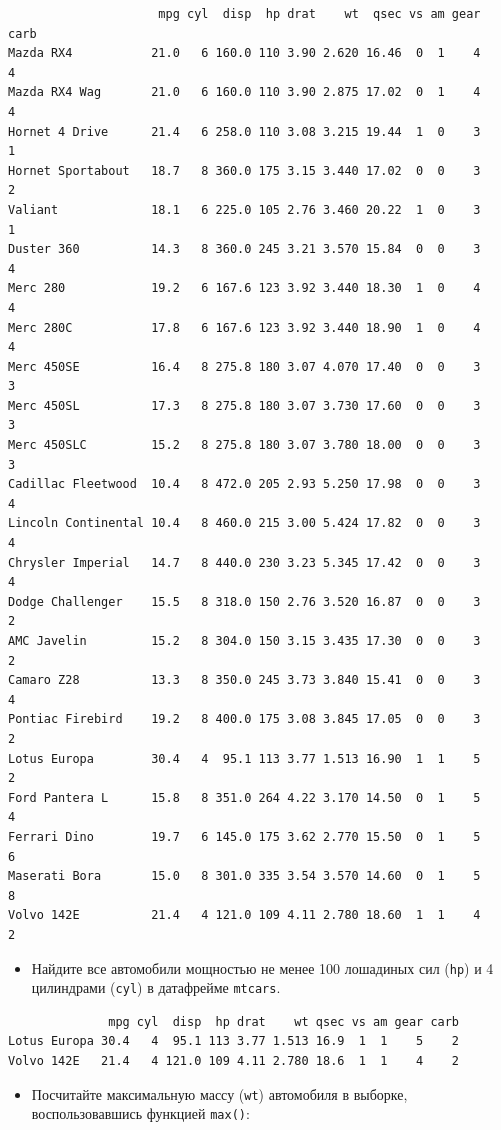 \documentclass[
]{book}
\providecommand{\tightlist}{%
  \setlength{\itemsep}{0pt}\setlength{\parskip}{0pt}}
\begin{document}
\begin{verbatim}
                     mpg cyl  disp  hp drat    wt  qsec vs am gear carb
Mazda RX4           21.0   6 160.0 110 3.90 2.620 16.46  0  1    4    4
Mazda RX4 Wag       21.0   6 160.0 110 3.90 2.875 17.02  0  1    4    4
Hornet 4 Drive      21.4   6 258.0 110 3.08 3.215 19.44  1  0    3    1
Hornet Sportabout   18.7   8 360.0 175 3.15 3.440 17.02  0  0    3    2
Valiant             18.1   6 225.0 105 2.76 3.460 20.22  1  0    3    1
Duster 360          14.3   8 360.0 245 3.21 3.570 15.84  0  0    3    4
Merc 280            19.2   6 167.6 123 3.92 3.440 18.30  1  0    4    4
Merc 280C           17.8   6 167.6 123 3.92 3.440 18.90  1  0    4    4
Merc 450SE          16.4   8 275.8 180 3.07 4.070 17.40  0  0    3    3
Merc 450SL          17.3   8 275.8 180 3.07 3.730 17.60  0  0    3    3
Merc 450SLC         15.2   8 275.8 180 3.07 3.780 18.00  0  0    3    3
Cadillac Fleetwood  10.4   8 472.0 205 2.93 5.250 17.98  0  0    3    4
Lincoln Continental 10.4   8 460.0 215 3.00 5.424 17.82  0  0    3    4
Chrysler Imperial   14.7   8 440.0 230 3.23 5.345 17.42  0  0    3    4
Dodge Challenger    15.5   8 318.0 150 2.76 3.520 16.87  0  0    3    2
AMC Javelin         15.2   8 304.0 150 3.15 3.435 17.30  0  0    3    2
Camaro Z28          13.3   8 350.0 245 3.73 3.840 15.41  0  0    3    4
Pontiac Firebird    19.2   8 400.0 175 3.08 3.845 17.05  0  0    3    2
Lotus Europa        30.4   4  95.1 113 3.77 1.513 16.90  1  1    5    2
Ford Pantera L      15.8   8 351.0 264 4.22 3.170 14.50  0  1    5    4
Ferrari Dino        19.7   6 145.0 175 3.62 2.770 15.50  0  1    5    6
Maserati Bora       15.0   8 301.0 335 3.54 3.570 14.60  0  1    5    8
Volvo 142E          21.4   4 121.0 109 4.11 2.780 18.60  1  1    4    2
\end{verbatim}

\begin{itemize}
\tightlist
\item
  Найдите все автомобили мощностью не менее 100 лошадиных сил (\texttt{hp}) и 4 цилиндрами (\texttt{cyl}) в датафрейме \texttt{mtcars}.
\end{itemize}

\begin{verbatim}
              mpg cyl  disp  hp drat    wt qsec vs am gear carb
Lotus Europa 30.4   4  95.1 113 3.77 1.513 16.9  1  1    5    2
Volvo 142E   21.4   4 121.0 109 4.11 2.780 18.6  1  1    4    2
\end{verbatim}

\begin{itemize}
\tightlist
\item
  Посчитайте максимальную массу (\texttt{wt}) автомобиля в выборке, воспользовавшись функцией \texttt{max()}:
\end{itemize}
\end{document}
